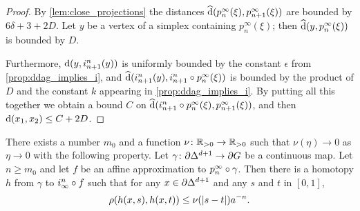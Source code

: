 \documentclass[a4paper]{article}
\begin{document}
\begin{proof}
  By \cref{lem:close_projections} the distances $\operatorname{\widehat{d}}(p^\infty_n(\xi),
  p^\infty_{n+1}(\xi))$ are bounded by $6\delta + 3 + 2D$. Let $y$ be a vertex
  of a simplex containing $p^\infty_n(\xi)$; then $\operatorname{\widehat{d}}(y, p^\infty_n(\xi))$
  is bounded by $D$.
  
  Furthermore, $\operatorname{d}(y, i^n_{n+1}(y))$ is uniformly bounded by the constant
  $\epsilon$ from \cref{prop:ddag_implies_i}, and $\operatorname{\widehat{d}}(i^n_{n+1}(y),
  i^n_{n+1}\circ p^\infty_n (\xi))$ is bounded by the product of $D$ and
  the constant $k$ appearing in \cref{prop:ddag_implies_i}. By putting all this
  together we obtain a bound $C$ on $\operatorname{\widehat{d}}(i^n_{n+1}\circ
  p^\infty_n(\xi), p^\infty_{n+1}(\xi))$, and then $\operatorname{d}(x_1, x_2) \leq C +
  2D$.
\end{proof}

\begin{proposition}\label{prop:uniform_homotopies}
  There exists a number $m_0$ and a function $\nu\colon\mathbb{R}_{>0}\to\mathbb{R}_{>0}$ such
  that $\nu(\eta)\to0$ as $\eta\to0$ with the following property. Let
  $\gamma\colon\partial\Delta^{d+1}\to\partial G$ be a continuous map. Let $n
  \geq m_0$ and let $f$ be an affine approximation to
  $p^\infty_n\circ\gamma$. Then there is a homotopy $h$ from $\gamma$ to
  $i^n_\infty\circ f$ such that for any $x \in \partial\Delta^{d+1}$ and
  any $s$ and $t$ in $[0,1]$,
  \begin{equation*}
    \rho(h(x,s), h(x,t)) \leq \nu(\left|s-t\right|) a^{-n}.
  \end{equation*}
\end{proposition}
\end{document}
